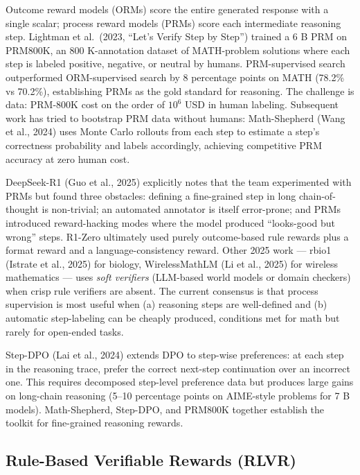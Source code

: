 Outcome reward models (ORMs) score the entire generated response with a single scalar; process reward models (PRMs) score each intermediate reasoning step. Lightman et al.~(2023, ``Let's Verify Step by Step'') trained a 6 B PRM on PRM800K, an 800 K-annotation dataset of MATH-problem solutions where each step is labeled positive, negative, or neutral by humans. PRM-supervised search outperformed ORM-supervised search by 8 percentage points on MATH (78.2\% vs 70.2\%), establishing PRMs as the gold standard for reasoning. The challenge is data: PRM-800K cost on the order of \(10^6\) USD in human labeling. Subsequent work has tried to bootstrap PRM data without humans: Math-Shepherd (Wang et al., 2024) uses Monte Carlo rollouts from each step to estimate a step's correctness probability and labels accordingly, achieving competitive PRM accuracy at zero human cost.

DeepSeek-R1 (Guo et al., 2025) explicitly notes that the team experimented with PRMs but found three obstacles: defining a fine-grained step in long chain-of-thought is non-trivial; an automated annotator is itself error-prone; and PRMs introduced reward-hacking modes where the model produced ``looks-good but wrong'' steps. R1-Zero ultimately used purely outcome-based rule rewards plus a format reward and a language-consistency reward. Other 2025 work --- rbio1 (Istrate et al., 2025) for biology, WirelessMathLM (Li et al., 2025) for wireless mathematics --- uses \emph{soft verifiers} (LLM-based world models or domain checkers) when crisp rule verifiers are absent. The current consensus is that process supervision is most useful when (a) reasoning steps are well-defined and (b) automatic step-labeling can be cheaply produced, conditions met for math but rarely for open-ended tasks.

Step-DPO (Lai et al., 2024) extends DPO to step-wise preferences: at each step in the reasoning trace, prefer the correct next-step continuation over an incorrect one. This requires decomposed step-level preference data but produces large gains on long-chain reasoning (5--10 percentage points on AIME-style problems for 7 B models). Math-Shepherd, Step-DPO, and PRM800K together establish the toolkit for fine-grained reasoning rewards.

\subsection{Rule-Based Verifiable Rewards (RLVR)}\label{rule-based-verifiable-rewards-rlvr}

